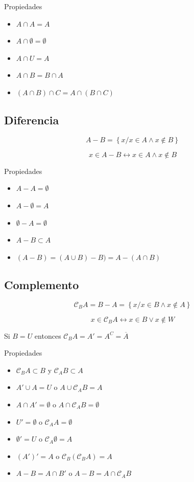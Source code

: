 \documentclass[
  16pt,
]{krantz}
\providecommand{\tightlist}{%
  \setlength{\itemsep}{0pt}\setlength{\parskip}{0pt}}
\theoremstyle{definition}
\theoremstyle{definition}
\theoremstyle{definition}
\theoremstyle{definition}
\theoremstyle{remark}
\begin{document}
Propiedades

\begin{itemize}
\tightlist
\item
  \(A\cap A=A\)
\item
  \(A\cap \emptyset=\emptyset\)
\item
  \(A\cap U=A\)
\item
  \(A\cap B=B\cap A\)
\item
  \((A\cap B)\cap C=A\cap(B\cap C)\)
\end{itemize}

\hypertarget{diferencia}{%
\subsection{Diferencia}\label{diferencia}}

\[
A- B=\left\{x/x\in A\wedge x\notin B\right\}
\]

\[
x\in A- B\leftrightarrow x\in A\wedge x\notin B
\]

Propiedades

\begin{itemize}
\tightlist
\item
  \(A- A=\emptyset\)
\item
  \(A- \emptyset=A\)
\item
  \(\emptyset-A=\emptyset\)
\item
  \(A- B\subset A\)
\item
  \((A-B)=(A\cup B)-B)=A-(A\cap B)\)
\end{itemize}

\hypertarget{complemento}{%
\subsection{Complemento}\label{complemento}}

\[
\mathcal{C}_BA=B-A=\left\{x/x\in B\wedge x\notin A\right\}
\]

\[
x\in \mathcal{C}_BA\leftrightarrow x\in B\vee x\notin W
\]

Si \(B=U\) entonces \(\mathcal{C}_BA=A'=A^C=\overline{A}\)

Propiedades

\begin{itemize}
\tightlist
\item
  \(\mathcal{C}_BA\subset B\) y \(\mathcal{C}_AB\subset A\)
\item
  \(A'\cup A=U\) o \(A\cup \mathcal{C}_AB=A\)
\item
  \(A\cap A'=\emptyset\) o \(A\cap \mathcal{C}_AB=\emptyset\)
\item
  \(U'=\emptyset\) o \(\mathcal{C}_AA=\emptyset\)
\item
  \(\emptyset'=U\) o \(\mathcal{C}_A\emptyset=A\)
\item
  \((A')'=A\) o \(\mathcal{C}_B(\mathcal{C}_BA)=A\)
\item
  \(A-B=A\cap B'\) o \(A-B=A\cap \mathcal{C}_AB\)
\end{itemize}
\end{document}
